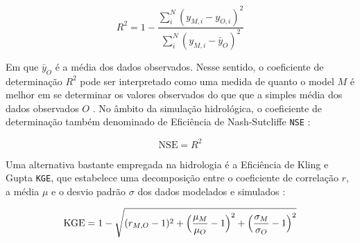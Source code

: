 \documentclass[./main.tex]{subfiles}
\begin{document}
\begin{linenomath*}
\begin{equation} 
	\label{eq:r2}
 R^2 = 1 - \frac{\sum_{i}^{N} (y_{M, i} - y_{O, i})^2}{\sum_{i}^{N} (y_{M, i} - \bar{y}_{O})^2}
\end{equation}
\end{linenomath*}
Em que $\bar{y}_{O}$ é a média dos dados observados. Nesse sentido, o coeficiente de determinação $R^2$ pode ser interpretado como uma medida de quanto o \gls{model} $M$ é melhor em se determinar os valores observados do que que a simples média dos dados observados $O$ . No âmbito da simulação hidrológica, o coeficiente de determinação também denominado de Eficiência de Nash-Sutcliffe \texttt{NSE} \cite{Nash1970}:
\begin{linenomath*}
\begin{equation} 
	\label{eq:nse}
 \text{NSE} = R^2
\end{equation}
\end{linenomath*}
Uma alternativa bastante empregada na hidrologia é a Eficiência de Kling e Gupta \texttt{KGE}, que estabelece uma decomposição entre o coeficiente de correlação $r$, a média $\mu$ e o desvio padrão $\sigma$ dos dados modelados e simulados \cite{Gupta2009}:
\begin{linenomath*}
\begin{equation} 
	\label{eq:kge}
 \text{KGE} = 1 - \sqrt{(r_{M,O} - 1)^2 + \Big{(}\frac{\mu_M}{\mu_O} - 1\Big{)}^2 + \Big{(}\frac{\sigma_M}{\sigma_O} - 1\Big{) }^2 } 
\end{equation}
\end{linenomath*}
\end{document}
